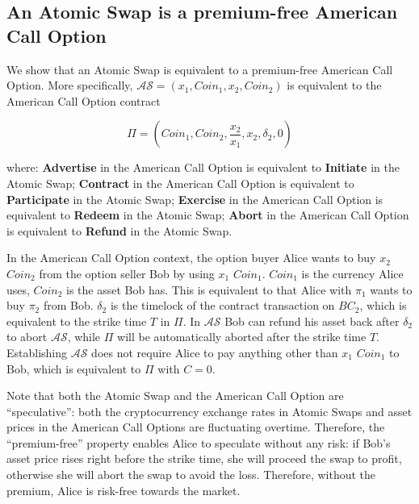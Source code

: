 \subsection{An Atomic Swap is a premium-free American Call Option}

We show that an Atomic Swap is equivalent to a premium-free American Call Option.
More specifically, $\mathcal{AS} = (x_1, Coin_1, x_2, Coin_2)$ is equivalent to the American Call Option contract

$$
\Pi = (Coin_1, Coin_2, \frac{x_2}{x_1}, x_2, \delta_2, 0)
$$

where:
\textbf{Advertise} in the American Call Option is equivalent to \textbf{Initiate} in the Atomic Swap;
\textbf{Contract} in the American Call Option is equivalent to \textbf{Participate} in the Atomic Swap;
\textbf{Exercise} in the American Call Option is equivalent to \textbf{Redeem} in the Atomic Swap;
\textbf{Abort} in the American Call Option is equivalent to \textbf{Refund} in the Atomic Swap.

In the American Call Option context, the option buyer Alice wants to buy $x_2$ $Coin_2$ from the option seller Bob by using $x_1$ $Coin_1$.
$Coin_1$ is the currency Alice uses, $Coin_2$ is the asset Bob has.
This is equivalent to that Alice with $\pi_1$ wants to buy $\pi_2$ from Bob.
$\delta_2$ is the timelock of the contract transaction on $BC_2$, which is equivalent to the strike time $T$ in $\Pi$. 
In $\mathcal{AS}$ Bob can refund his asset back after $\delta_2$ to abort $\mathcal{AS}$, while $\Pi$ will be automatically aborted after the strike time $T$.
Establishing $\mathcal{AS}$ does not require Alice to pay anything other than $x_1$ $Coin_1$ to Bob, which is equivalent to $\Pi$ with $C = 0$.

Note that both the Atomic Swap and the American Call Option are ``speculative'':
both the cryptocurrency exchange rates in Atomic Swaps and asset prices in the American Call Options are fluctuating overtime.
Therefore, the ``premium-free'' property enables Alice to speculate without any risk:
if Bob's asset price rises right before the strike time, she will proceed the swap to profit,
otherwise she will abort the swap to avoid the loss.
Therefore, without the premium, Alice is risk-free towards the market.